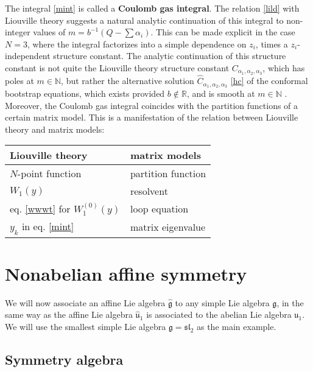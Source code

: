\documentclass[12pt,a4paper,notitlepage]{report}
\numberwithin{equation}{section}
\theoremstyle{break}
\begin{document}
The integral \eqref{mint} is called a \textbf{\boldmath Coulomb gas integral}.
The relation \eqref{lild} with Liouville theory suggests a natural analytic continuation of this integral to non-integer values of $m=b^{-1}(Q-\sum\alpha_i)$.
This can be made explicit in the case $N=3$, where the integral factorizes into a simple dependence on $z_i$, times a $z_i$-independent structure constant.
The analytic continuation of this structure constant is not quite the Liouville theory structure constant $C_{\alpha_1,\alpha_2,\alpha_3}$, which has poles at $m\in{\mathbb{N}}$, but rather the alternative solution $\hat{C}_{\alpha_1,\alpha_2,\alpha_3}$ \eqref{hc} of the conformal bootstrap equations, which exists provided $b\notin {\mathbb{R}}$, and is smooth at $m\in{\mathbb{N}}$ \cite{zam05}. 
Moreover, the Coulomb gas integral coincides with the partition functions of a certain matrix model.
This is a manifestation of the
relation between Liouville theory and matrix models:
\begin{center}
 \begin{tabular}{|l|l|}
  \hline
Liouville theory & matrix models
\\
\hline \hline
$N$-point function & partition function 
\\
\hline
$W_1(y)$  & resolvent
\\
\hline
eq. \eqref{wwwt} for $W_1^{(0)}(y)$ & loop equation 
\\
\hline
$y_k$ in eq. \eqref{mint} & matrix eigenvalue
\\
\hline
 \end{tabular}
\end{center}



\section{Nonabelian affine symmetry}

We will now associate an affine Lie algebra $\hat{\mathfrak{g}}$ to any simple Lie algebra $\mathfrak{g}$, in the same way as the  affine Lie algebra $\hat{\mathfrak{u}}_1$ is associated to the abelian Lie algebra $\mathfrak{u}_1$.
We will use the smallest simple Lie algebra $\mathfrak{g}=\mathfrak{sl}_2$ as the main example.

\subsection{Symmetry algebra}
\end{document}
